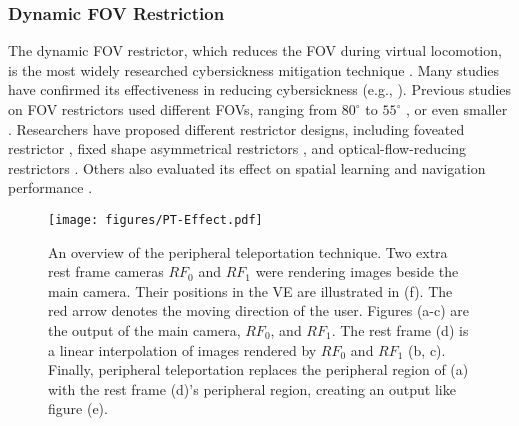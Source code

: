 \subsubsection{Dynamic FOV Restriction}
The dynamic FOV restrictor, which reduces the FOV during virtual locomotion, is the most widely researched cybersickness mitigation technique \cite{bolas_dynamic_2014}. 
Many studies have confirmed its effectiveness in reducing cybersickness 
(e.g., \cite{fernandes_combating_2016, zhao_mitigation_2022, wu_adaptive_2022}).
Previous studies on FOV restrictors used different FOVs, ranging from $80^\circ$ \cite{fernandes_combating_2016, zhao_mitigation_2022} to $55^\circ$ \cite{wu_adaptive_2022, adhanom_effect_2020}, or even smaller \cite{bala_dynamic_2021, al_zayer_effect_2019}.
Researchers have proposed different restrictor designs, including foveated restrictor \cite{adhanom_effect_2020}, fixed shape asymmetrical restrictors \cite{wu_asymmetric_2022, wu_dont_2021}, and optical-flow-reducing restrictors \cite{wu_adaptive_2022, bala_dynamic_2021}.
Others also evaluated its effect on spatial learning \cite{adhanom_field--view_2021} and navigation performance \cite{al_zayer_effect_2019}. 

\begin{figure*}[t]
    \centering
    \texttt{[image: figures/PT-Effect.pdf]}
    \caption{An overview of the peripheral teleportation technique. 
    Two extra rest frame cameras $RF_0$ and $RF_1$ were rendering images beside the main camera. 
    Their positions in the VE are illustrated in (f).
    The red arrow denotes the moving direction of the user.
    Figures (a-c) are the output of the main camera, $RF_0$, and $RF_1$.
    The rest frame (d) is a linear interpolation of images rendered by $RF_0$ and $RF_1$ (b, c).
    Finally, peripheral teleportation replaces the peripheral region of (a) with the rest frame (d)'s peripheral region, creating an output like figure (e).
    }
    \label{fig:pt_space}
\end{figure*}


